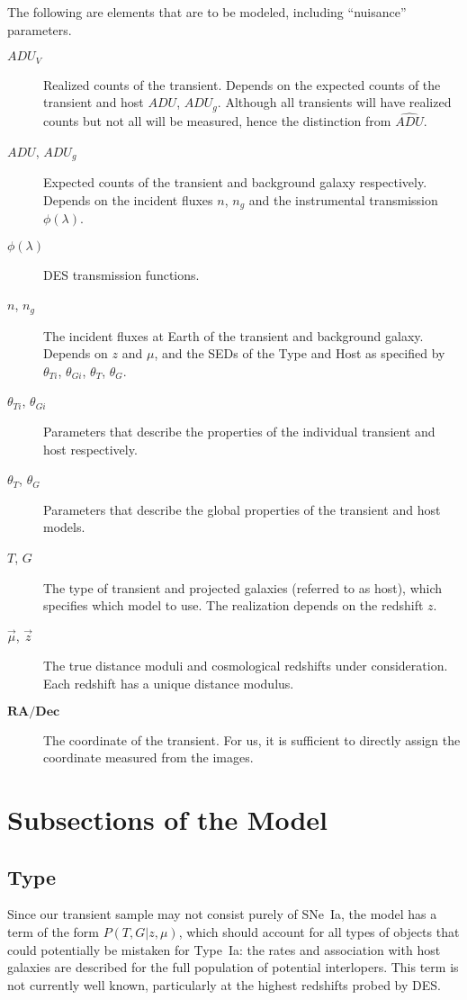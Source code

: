 \documentclass[preprint]{aastex}
\begin{document}
The following are elements that are to be modeled, including ``nuisance'' parameters.
\begin{description}
\item[$\mathit{ADU}_V$]  Realized counts
of the transient.  Depends
on the expected counts of the transient and host $\mathit{ADU}$, $\mathit{ADU}_g$.
Although all transients will have realized counts but not all will be measured, hence the distinction
from $\hat{\mathit{ADU}}$.
\item[$\mathit{ADU}$, $\mathit{ADU}_{g}$]  Expected counts
of the transient and background galaxy respectively.  Depends
on the incident fluxes $n$, $n_g$ and the instrumental
transmission $\phi(\lambda)$.
\item[$\phi(\lambda)$] DES transmission functions.
\item[$n$, $n_g$] The incident fluxes at Earth of the transient and background
galaxy.  Depends on  $z$ and $\mu$, and the SEDs of the Type and Host as
specified by $\theta_{Ti}$, $\theta_{Gi}$, $\theta_{T}$, $\theta_{G}$.
\item[$\theta_{Ti}$, $\theta_{Gi}$] Parameters that describe the properties of the individual transient
and host respectively.
\item[$\theta_{T}$, $\theta_{G}$] Parameters that describe the global properties of the transient
and host models.
\item[$T$, $G$]  The type of transient and projected galaxies (referred to as host), which
specifies which model to use. The realization depends on the redshift $z$.
\item[$\vec{\mu}$, $\vec{z}$]  The true distance moduli and cosmological redshifts under
consideration.  Each redshift has a unique distance modulus.
\item[$\mathbf{RA/Dec}$] The coordinate of the transient.  For us, it is sufficient to directly
assign the coordinate measured
from the images.
\end{description}

\section{Subsections of the Model}

\subsection{Type}
\label{type:sec}
Since our transient sample may not consist purely of SNe~Ia, the model
has a term of the form $P(T, G | z,\mu)$, which should account for all types of
objects that could potentially be mistaken for Type~Ia:
the rates and association with host galaxies are described for
the full population of potential interlopers.
This term is not currently well known, particularly at the highest redshifts probed by DES.
\end{document}
